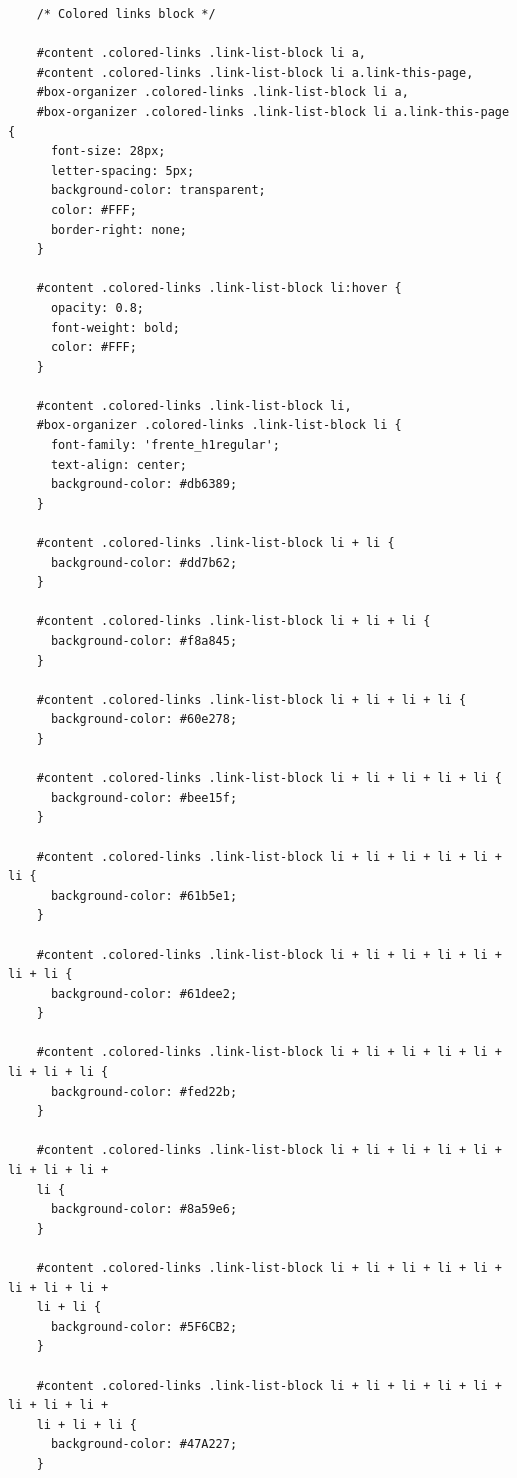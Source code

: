 {\tiny
  \begin{verbatim}
    /* Colored links block */
    
    #content .colored-links .link-list-block li a,
    #content .colored-links .link-list-block li a.link-this-page,
    #box-organizer .colored-links .link-list-block li a,
    #box-organizer .colored-links .link-list-block li a.link-this-page {
      font-size: 28px;
      letter-spacing: 5px;
      background-color: transparent;
      color: #FFF;
      border-right: none;
    }
    
    #content .colored-links .link-list-block li:hover {
      opacity: 0.8;
      font-weight: bold;
      color: #FFF;
    }
    
    #content .colored-links .link-list-block li,
    #box-organizer .colored-links .link-list-block li {
      font-family: 'frente_h1regular';
      text-align: center;
      background-color: #db6389;
    }
    
    #content .colored-links .link-list-block li + li {
      background-color: #dd7b62;
    }
    
    #content .colored-links .link-list-block li + li + li {
      background-color: #f8a845;
    }
    
    #content .colored-links .link-list-block li + li + li + li {
      background-color: #60e278;
    }
    
    #content .colored-links .link-list-block li + li + li + li + li {
      background-color: #bee15f;
    }
    
    #content .colored-links .link-list-block li + li + li + li + li + li {
      background-color: #61b5e1;
    }
    
    #content .colored-links .link-list-block li + li + li + li + li + li + li {
      background-color: #61dee2;
    }
    
    #content .colored-links .link-list-block li + li + li + li + li + li + li + li {
      background-color: #fed22b;
    }
    
    #content .colored-links .link-list-block li + li + li + li + li + li + li + li +
    li {
      background-color: #8a59e6;
    }
    
    #content .colored-links .link-list-block li + li + li + li + li + li + li + li +
    li + li {
      background-color: #5F6CB2;
    }
    
    #content .colored-links .link-list-block li + li + li + li + li + li + li + li +
    li + li + li {
      background-color: #47A227;
    }
    

\end{verbatim}}
